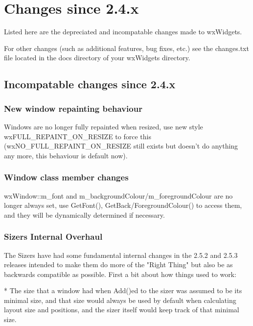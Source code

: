 \section{Changes since 2.4.x}\label{changes}

Listed here are the depreciated and incompatable changes made to wxWidgets.

For other changes (such as additional features, bug fixes, etc.) see the changes.txt file located in the docs directory of your wxWidgets directory.

\subsection{Incompatable changes since 2.4.x}\label{incompatiblesince24}

\subsubsection{New window repainting behaviour}\label{newwindowrepainting}

Windows are no longer fully repainted when resized, use new style wxFULL\_REPAINT\_ON\_RESIZE to force this (wxNO\_FULL\_REPAINT\_ON\_RESIZE still exists but doesn't do anything any more, this behaviour is default now).

\subsubsection{Window class member changes}\label{windowclassmemberchanges}

wxWindow::m\_font and m\_backgroundColour/m\_foregroundColour are no longer always set, use GetFont(), GetBack/ForegroundColour() to access them, and they will be dynamically determined if necessary.

\subsubsection{Sizers Internal Overhaul}\label{sizersinternaloverhaul}

The Sizers have had some fundamental internal changes in the 2.5.2 and 2.5.3 releases intended to make them do more of the "Right Thing" but also be as backwards compatible as possible.  First a bit about how things used to work:

    * The size that a window had when Add()ed to the sizer was assumed
      to be its minimal size, and that size would always be used by
      default when calculating layout size and positions, and the
      sizer itself would keep track of that minimal size.

